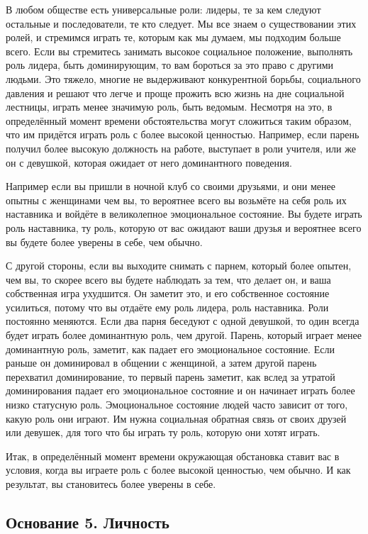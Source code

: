 В любом обществе есть универсальные роли: лидеры, те за кем следуют остальные и последователи, те кто следует. Мы все знаем о существовании этих ролей, и стремимся играть те, которым как мы думаем, мы подходим больше всего. Если вы стремитесь занимать высокое социальное положение, выполнять роль лидера, быть доминирующим, то вам бороться за это право с другими людьми. Это тяжело, многие не выдерживают конкурентной борьбы, социального давления и решают что легче и проще прожить всю жизнь на дне социальной лестницы, играть менее значимую роль, быть ведомым. Несмотря на это, в определённый момент времени обстоятельства могут сложиться таким образом, что им придётся играть роль с более высокой ценностью. Например, если парень получил более высокую должность на работе, выступает в роли учителя, или же он с девушкой, которая ожидает от него доминантного поведения.

Например если вы пришли в ночной клуб со своими друзьями, и они менее опытны с женщинами чем вы, то вероятнее всего вы возьмёте на себя роль их наставника и войдёте в великолепное эмоциональное состояние. Вы будете играть роль наставника, ту роль, которую от вас ожидают ваши друзья и вероятнее всего вы будете более уверены в себе, чем обычно.

С другой стороны, если вы выходите снимать с парнем, который более опытен, чем вы, то скорее всего вы будете наблюдать за тем, что делает он, и ваша собственная игра ухудшится. Он заметит это, и его собственное состояние усилиться, потому что вы отдаёте ему роль лидера, роль наставника. Роли постоянно меняются. Если два парня беседуют с одной девушкой, то один всегда будет играть более доминантную роль, чем другой. Парень, который играет менее доминантную роль, заметит, как падает его эмоциональное состояние. Если раньше он доминировал в общении с женщиной, а затем другой парень перехватил доминирование, то первый парень заметит, как вслед за утратой доминирования падает его эмоциональное состояние и он начинает играть более низко статусную роль. Эмоциональное состояние людей часто зависит от того, какую роль они играют. Им нужна социальная обратная связь от своих друзей или девушек, для того что бы играть ту роль, которую они хотят играть.

Итак, в определённый момент времени окружающая обстановка ставит вас в условия, когда вы играете роль с более высокой ценностью, чем обычно. И как результат, вы становитесь более уверены в себе.

\subsection{Основание 5. Личность}

